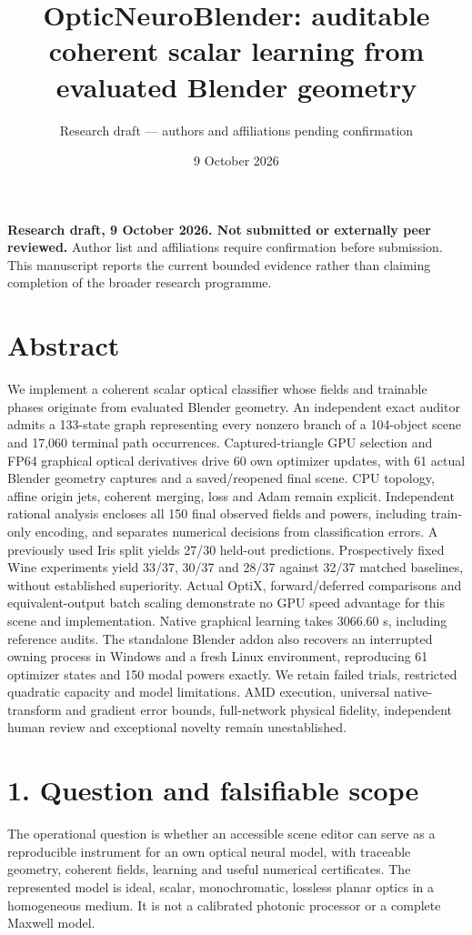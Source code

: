 \documentclass[11pt]{article}
\title{OpticNeuroBlender: auditable coherent scalar learning from evaluated Blender geometry}
\author{Research draft --- authors and affiliations pending confirmation}
\date{9 October 2026}
\begin{document}
\maketitle

\textbf{Research draft, 9 October 2026. Not submitted or externally peer reviewed.} Author list and affiliations require confirmation before submission. This manuscript reports the current bounded evidence rather than claiming completion of the broader research programme.

\section*{Abstract}

We implement a coherent scalar optical classifier whose fields and trainable phases originate from evaluated Blender geometry. An independent exact auditor admits a 133-state graph representing every nonzero branch of a 104-object scene and 17,060 terminal path occurrences. Captured-triangle GPU selection and FP64 graphical optical derivatives drive 60 own optimizer updates, with 61 actual Blender geometry captures and a saved/reopened final scene. CPU topology, affine origin jets, coherent merging, loss and Adam remain explicit. Independent rational analysis encloses all 150 final observed fields and powers, including train-only encoding, and separates numerical decisions from classification errors. A previously used Iris split yields 27/30 held-out predictions. Prospectively fixed Wine experiments yield 33/37, 30/37 and 28/37 against 32/37 matched baselines, without established superiority. Actual OptiX, forward/deferred comparisons and equivalent-output batch scaling demonstrate no GPU speed advantage for this scene and implementation. Native graphical learning takes 3066.60 s, including reference audits. The standalone Blender addon also recovers an interrupted owning process in Windows and a fresh Linux environment, reproducing 61 optimizer states and 150 modal powers exactly. We retain failed trials, restricted quadratic capacity and model limitations. AMD execution, universal native-transform and gradient error bounds, full-network physical fidelity, independent human review and exceptional novelty remain unestablished.

\section*{1. Question and falsifiable scope}

The operational question is whether an accessible scene editor can serve as a reproducible instrument for an own optical neural model, with traceable geometry, coherent fields, learning and useful numerical certificates. The represented model is ideal, scalar, monochromatic, lossless planar optics in a homogeneous medium. It is not a calibrated photonic processor or a complete Maxwell model.
\end{document}
